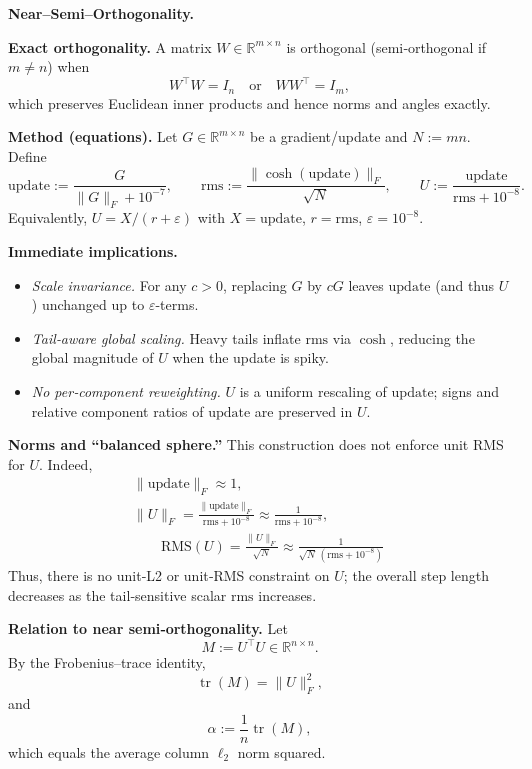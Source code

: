 \documentclass[12pt,a4paper]{article}
\begin{document}
\medskip
\noindent\textbf{Near–Semi–Orthogonality.}

\noindent\textbf{Exact orthogonality.}
A matrix \(W \in \mathbb{R}^{m \times n}\) is orthogonal (semi‑orthogonal if \(m \neq n\)) when
\[
W^\top W = I_n \quad \text{or} \quad W W^\top = I_m ,
\]
which preserves Euclidean inner products and hence norms and angles exactly.

\medskip
\noindent\textbf{Method (equations).}
Let \(G \in \mathbb{R}^{m \times n}\) be a gradient/update and \(N := mn\). Define
\[
\mathrm{update} := \frac{G}{\|G\|_{F} + 10^{-7}}, 
\qquad
\mathrm{rms} := \frac{\big\| \cosh(\mathrm{update}) \big\|_{F}}{\sqrt{N}},
\qquad
U := \frac{\mathrm{update}}{\mathrm{rms} + 10^{-8}}.
\]
Equivalently, \(U = X/(r+\varepsilon)\) with \(X=\mathrm{update}\), \(r=\mathrm{rms}\), \(\varepsilon=10^{-8}\).

\medskip
\noindent\textbf{Immediate implications.}
\begin{itemize}
\item \emph{Scale invariance.} For any \(c>0\), replacing \(G\) by \(cG\) leaves \(\mathrm{update}\) (and thus \(U\)) unchanged up to \(\varepsilon\)-terms.
\item \emph{Tail‑aware global scaling.} Heavy tails inflate \(\mathrm{rms}\) via \(\cosh\), reducing the global magnitude of \(U\) when the update is spiky.
\item \emph{No per‑component reweighting.} \(U\) is a uniform rescaling of \(\mathrm{update}\); signs and relative component ratios of \(\mathrm{update}\) are preserved in \(U\).
\end{itemize}

\medskip
\noindent\textbf{Norms and “balanced sphere.”}
This construction does not enforce unit RMS for \(U\). Indeed,
\begin{align}
\|\mathrm{update}\|_{F} \approx 1,\qquad\\
\|U\|_{F} = \frac{\|\mathrm{update}\|_{F}}{\mathrm{rms} + 10^{-8}} \approx \frac{1}{\mathrm{rms} + 10^{-8}},\\
\qquad\mathrm{RMS}(U) = \frac{\|U\|_{F}}{\sqrt{N}} \approx \frac{1}{\sqrt{N}\,(\mathrm{rms}+10^{-8})}\ \end{align}
Thus, there is no unit‑L2 or unit‑RMS constraint on \(U\); the overall step length decreases as the tail‑sensitive scalar \(\mathrm{rms}\) increases.

\medskip
\noindent\textbf{Relation to near semi‑orthogonality.}
Let 
\[
M := U^\top U \in \mathbb{R}^{n \times n}.
\]
By the Frobenius–trace identity,
\[
\operatorname{tr}(M) = \|U\|_F^2,
\]
and
\[
\alpha := \frac{1}{n} \operatorname{tr}(M),
\]
which equals the average column $\ell_2$ norm squared.  
\end{document}
